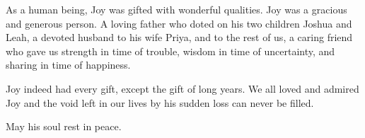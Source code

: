 \begin{multicols}{2}
As a human being, Joy was gifted with wonderful qualities. Joy was a gracious and generous person. A loving father who doted on his two children Joshua and Leah, a devoted husband to his wife Priya, and to the rest of us,  a caring friend who gave us strength in time of trouble, wisdom in time of uncertainty, and sharing in time of happiness. 

Joy indeed had every gift, except the gift of long years. We all loved and admired Joy and the void left in our lives by his sudden loss can never be filled.

May his soul rest in peace.


\end{multicols}



